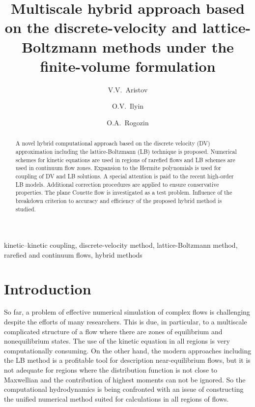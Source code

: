 \documentclass[]{elsarticle} %
\begin{document}
\begin{frontmatter}

\title{Multiscale hybrid approach based on the discrete-velocity and lattice-Boltzmann methods under the finite-volume formulation}

\author[ccas]{V.V.~Aristov}

\author[ccas]{O.V.~Ilyin}

\author[skoltech,ccas]{O.A.~Rogozin}

\address[ccas]{Dorodnicyn Computing Center,
    Federal Research Center "Computer Science and Control" of Russian Academy of Science, Moscow, Russia}
\address[skoltech]{Center for Design, Manufacturing, and Materials,
    Skolkovo Institute of Science and Technology, Skolkovo, Russia}

\begin{abstract}

A novel hybrid computational approach based on the discrete velocity (DV) approximation
including the lattice-Boltzmann (LB) technique is proposed.
Numerical schemes for kinetic equations are used in regions of rarefied flows and LB schemes are used in continuum flow zones.
Expansion to the Hermite polynomials is used for coupling of DV and LB solutions.
A special attention is paid to the recent high-order LB models.
Additional correction procedures are applied to ensure conservative properties.
The plane Couette flow is investigated as a test problem.
Influence of the breakdown criterion to accuracy and efficiency of the proposed hybrid method is studied.

\end{abstract}

\begin{keyword}
kinetic--kinetic coupling, discrete-velocity method, lattice-Boltzmann method, rarefied and continuum flows, hybrid methods
\end{keyword}

\end{frontmatter}

\linenumbers

\section{Introduction}\label{sec:intro}

So far, a problem of effective numerical simulation of complex flows is challenging despite the efforts of many researchers. This is due, in particular, to a multiscale complicated structure of a flow where there are zones of equilibrium and nonequilibrium states. The use of the kinetic equation in all regions is very computationally consuming. On the other hand, the modern approaches including the LB method is a profitable tool for description near-equilibrium flows, but it is not adequate for regions where the distribution function is not close to Maxwellian and  the contribution of highest moments can not be ignored. So the computational hydrodynamics is being confronted with an issue of constructing the unified numerical method suited for calculations in all regions of flows.
\end{document}

